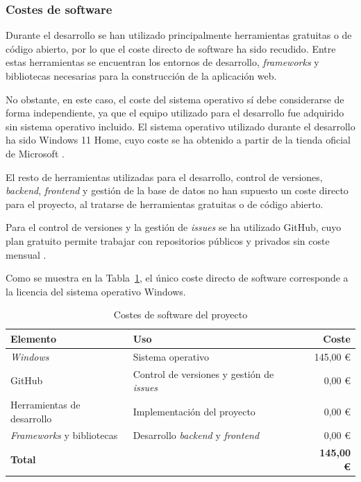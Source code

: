 \subsubsection{Costes de software}

Durante el desarrollo se han utilizado principalmente herramientas gratuitas o de código abierto, por lo que el coste directo de software ha sido recudido. Entre estas herramientas se encuentran los entornos de desarrollo, \textit{frameworks} y bibliotecas necesarias para la construcción de la aplicación web.

No obstante, en este caso, el coste del sistema operativo sí debe considerarse de forma independiente, ya que el equipo utilizado para el desarrollo fue adquirido sin sistema operativo incluido. El sistema operativo utilizado durante el desarrollo ha sido Windows 11 Home, cuyo coste se ha obtenido a partir de la tienda oficial de Microsoft \cite{windows11Home}.

El resto de herramientas utilizadas para el desarrollo, control de versiones, \textit{backend}, \textit{frontend} y gestión de la base de datos no han supuesto un coste directo para el proyecto, al tratarse de herramientas gratuitas o de código abierto.

Para el control de versiones y la gestión de \textit{issues} se ha utilizado GitHub, cuyo plan gratuito permite trabajar con repositorios públicos y privados sin coste mensual \cite{githubPricing}.

Como se muestra en la Tabla~\ref{tab:costes-software}, el único coste directo de software corresponde a la licencia del sistema operativo Windows.

\begin{table}[H]
\centering
\begin{tabular}{l l r}
	\toprule
	\textbf{Elemento} & \textbf{Uso} & \textbf{Coste} \\
	\midrule
	\textit{Windows} & Sistema operativo & 145,00 € \\
	GitHub & Control de versiones y gestión de \textit{issues} & 0,00 € \\
	Herramientas de desarrollo & Implementación del proyecto & 0,00 € \\
	\textit{Frameworks} y bibliotecas & Desarrollo \textit{backend} y \textit{frontend} & 0,00 € \\
	\midrule
	\textbf{Total} & & \textbf{145,00 €} \\
	\bottomrule
\end{tabular}
\caption{Costes de software del proyecto}
\label{tab:costes-software}
\end{table}

